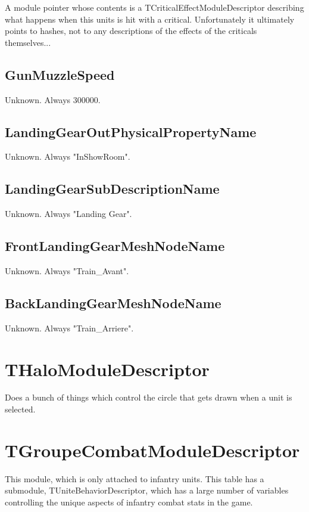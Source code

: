 \documentclass{article}
\begin{document}
A module pointer whose contents is a TCriticalEffectModuleDescriptor describing what happens when this units is hit with a critical. Unfortunately it ultimately points to hashes, not to any descriptions of the effects of the criticals themselves...

\subsection{GunMuzzleSpeed}

Unknown. Always 300000.

\subsection{LandingGearOutPhysicalPropertyName}

Unknown. Always "InShowRoom".

\subsection{LandingGearSubDescriptionName}

Unknown. Always "Landing Gear".

\subsection{FrontLandingGearMeshNodeName}

Unknown. Always "Train\_Avant".

\subsection{BackLandingGearMeshNodeName}

Unknown. Always "Train\_Arriere".

\section{THaloModuleDescriptor}

Does a bunch of things which control the circle that gets drawn when a unit is selected.

\section{TGroupeCombatModuleDescriptor}

This module, which is only attached to infantry units. This table has a submodule, TUniteBehaviorDescriptor, which has a large number of variables controlling the unique aspects of infantry combat stats in the game.
\end{document}

